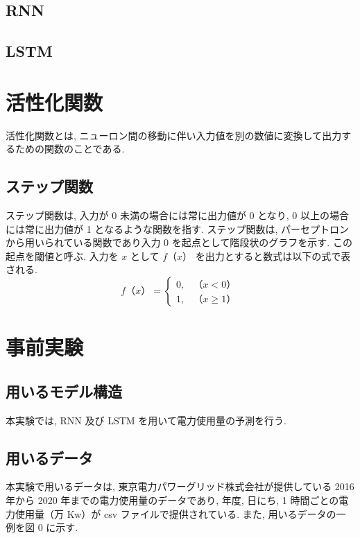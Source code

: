 \subsection{RNN}
\subsection{LSTM}

\section{活性化関数}
活性化関数とは, ニューロン間の移動に伴い入力値を別の数値に変換して出力するための関数のことである.
\subsection{ステップ関数}
ステップ関数は, 入力が 0 未満の場合には常に出力値が 0 となり, 0 以上の場合には常に出力値が 1 となるような関数を指す. ステップ関数は, パーセプトロンから用いられている関数であり入力 0 を起点として階段状のグラフを示す. この起点を閾値と呼ぶ. 入力を $x$ として $f（x）$ を出力とすると数式は以下の式で表される.
\begin{equation}
f（x）= \begin{cases}
0, & （x < 0）\\
1, & （x \geq 1）
\end{cases}
\end{equation}

\section{事前実験}
\subsection{用いるモデル構造}
本実験では, RNN 及び LSTM を用いて電力使用量の予測を行う. 
\subsection{用いるデータ}
本実験で用いるデータは, 東京電力パワーグリッド株式会社が提供している 2016 年から 2020 年までの電力使用量のデータであり, 年度, 日にち, 1 時間ごとの電力使用量（万 Kw）が csv ファイルで提供されている. また, 用いるデータの一例を図 0 に示す.

